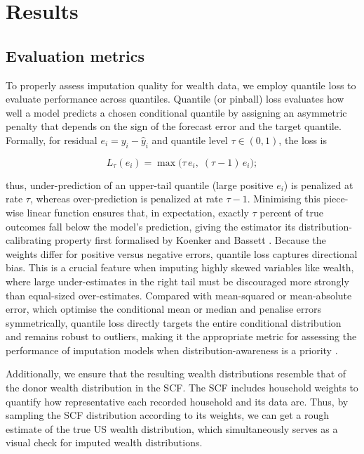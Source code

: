 \section{Results}

\subsection{Evaluation metrics}

To properly assess imputation quality for wealth data, we employ quantile loss to evaluate performance across quantiles. Quantile (or pinball) loss evaluates how well a model predicts a chosen conditional quantile by assigning an asymmetric penalty that depends on the sign of the forecast error and the target quantile. Formally, for residual $e_i = y_i - \hat{y}_i$ and quantile level $\tau\in(0,1)$, the loss is 

$$L_\tau(e_i)=\max\!\bigl(\tau\,e_i,\;(\tau-1)\,e_i\bigr);$$

thus, under-prediction of an upper-tail quantile (large positive $e_i$) is penalized at rate $\tau$, whereas over-prediction is penalized at rate $\tau-1$. Minimising this piece-wise linear function ensures that, in expectation, exactly $\tau$ percent of true outcomes fall below the model's prediction, giving the estimator its distribution-calibrating property first formalised by Koenker and Bassett \citep{koenker1978regression}. Because the weights differ for positive versus negative errors, quantile loss captures directional bias. This is a crucial feature when imputing highly skewed variables like wealth, where large under-estimates in the right tail must be discouraged more strongly than equal-sized over-estimates. Compared with mean-squared or mean-absolute error, which optimise the conditional mean or median and penalise errors symmetrically, quantile loss directly targets the entire conditional distribution and remains robust to outliers, making it the appropriate metric for assessing the performance of imputation models when distribution-awareness is a priority \citep{ghenis2018quantile}.

Additionally, we ensure that the resulting wealth distributions resemble that of the donor wealth distribution in the SCF. The SCF includes household weights to quantify how representative each recorded household and its data are. Thus, by sampling the SCF distribution according to its weights, we can get a rough estimate of the true US wealth distribution, which simultaneously serves as a visual check for imputed wealth distributions.

